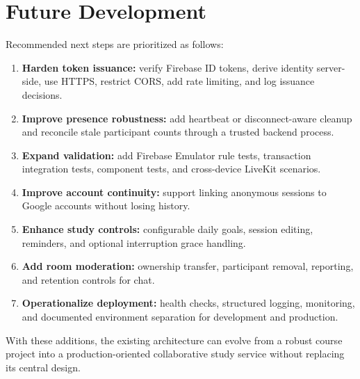 \section{Future Development}
Recommended next steps are prioritized as follows:
\begin{enumerate}
    \item \textbf{Harden token issuance:} verify Firebase ID tokens, derive identity server-side, use HTTPS, restrict CORS, add rate limiting, and log issuance decisions.
    \item \textbf{Improve presence robustness:} add heartbeat or disconnect-aware cleanup and reconcile stale participant counts through a trusted backend process.
    \item \textbf{Expand validation:} add Firebase Emulator rule tests, transaction integration tests, component tests, and cross-device LiveKit scenarios.
    \item \textbf{Improve account continuity:} support linking anonymous sessions to Google accounts without losing history.
    \item \textbf{Enhance study controls:} configurable daily goals, session editing, reminders, and optional interruption grace handling.
    \item \textbf{Add room moderation:} ownership transfer, participant removal, reporting, and retention controls for chat.
    \item \textbf{Operationalize deployment:} health checks, structured logging, monitoring, and documented environment separation for development and production.
\end{enumerate}

With these additions, the existing architecture can evolve from a robust course project into a production-oriented collaborative study service without replacing its central design.
